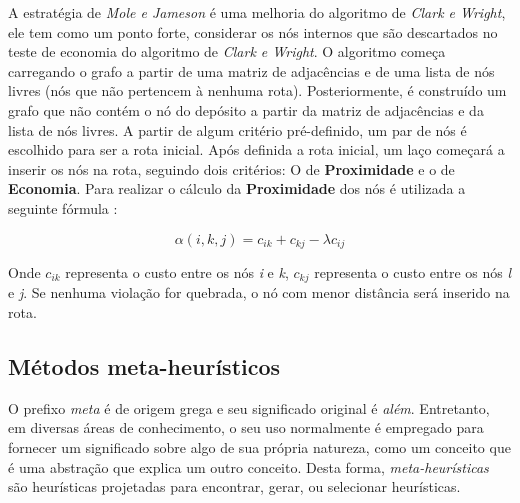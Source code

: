 A estratégia de \emph{Mole e Jameson} é uma melhoria do algoritmo de \emph{Clark e Wright}, ele tem como um ponto forte, considerar os nós internos que são descartados no teste de economia do algoritmo de \emph{Clark e Wright}. O algoritmo começa carregando o grafo a partir de uma matriz de adjacências e de uma lista de nós livres (nós que não pertencem à nenhuma rota). Posteriormente, é construído um grafo que não contém o nó do depósito a partir da matriz de adjacências e da lista de nós livres. A partir de algum critério pré-definido, um par de nós é escolhido para ser a rota inicial. Após definida a rota inicial, um laço começará a inserir os nós na rota, seguindo dois critérios: O de \textbf{Proximidade} e o de \textbf{Economia}.
Para realizar o cálculo da \textbf{Proximidade} dos nós é utilizada a seguinte fórmula \cite[p. 33]{maxwell}:

\[\alpha(i, k, j) = c_{ik} + c_{kj} - \lambda c_{ij} \]

Onde $c_{ik}$ representa o custo entre os nós \emph{i} e \emph{k}, $c_{kj}$  representa o custo entre os nós \emph{l} e \emph{j}. Se nenhuma violação for quebrada, o nó com menor distância será inserido na rota.


\subsection{Métodos meta-heurísticos}\label{metaheuristica}
O prefixo \emph{meta} é de origem grega e seu significado original é \emph{além}. Entretanto, em diversas áreas de conhecimento, o seu uso normalmente é empregado para fornecer um significado sobre algo de sua própria natureza, como um conceito que é uma abstração que explica um outro conceito. Desta forma, \emph{meta-heurísticas} são heurísticas projetadas para encontrar, gerar, ou selecionar heurísticas.

